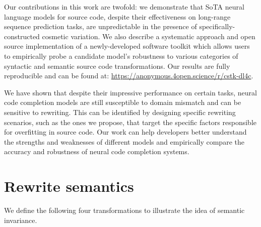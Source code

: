 \documentclass[usenames,dvipsnames]{article} %
\begin{document}
  Our contributions in this work are twofold: we demonstrate that SoTA neural language models for source code, despite their effectiveness on long-range sequence prediction tasks, are unpredictable in the presence of specifically-constructed cosmetic variation. We also describe a systematic approach and open source implementation of a newly-developed software toolkit which allows users to empirically probe a candidate model's robustness to various categories of syntactic and semantic source code transformations. Our results are fully reproducible and can be found at: \url{https://anonymous.4open.science/r/cstk-dl4c}.


  We have shown that despite their impressive performance on certain tasks, neural code completion models are still susceptible to domain mismatch and can be sensitive to rewriting. This can be identified by designing specific rewriting scenarios, such as the ones we propose, that target the specific factors responsible for overfitting in source code. Our work can help developers better understand the strengths and weaknesses of different models and empirically compare the accuracy and robustness of neural code completion systems.


  
  
  \pagebreak
  \appendix
  \section{Rewrite semantics}\label{sec:rewrite_semantics}

  We define the following four transformations to illustrate the idea of semantic invariance.
\end{document}

